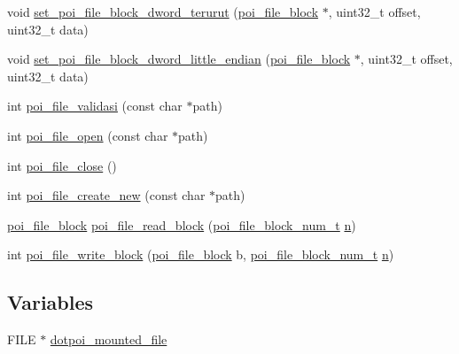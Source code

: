 \begin{DoxyCompactItemize}
\item 
void \hyperlink{file-manager_8h_a0dc02398a042528d16e54822f1543742}{set\-\_\-poi\-\_\-file\-\_\-block\-\_\-dword\-\_\-terurut} (\hyperlink{structpoi__file__block}{poi\-\_\-file\-\_\-block} $\ast$, uint32\-\_\-t offset, uint32\-\_\-t data)
\item 
void \hyperlink{file-manager_8h_a3e138c2766b909a90fd280bc5e899bfe}{set\-\_\-poi\-\_\-file\-\_\-block\-\_\-dword\-\_\-little\-\_\-endian} (\hyperlink{structpoi__file__block}{poi\-\_\-file\-\_\-block} $\ast$, uint32\-\_\-t offset, uint32\-\_\-t data)
\item 
int \hyperlink{file-manager_8h_af091ab9b6704b6affa17ea12fd51e628}{poi\-\_\-file\-\_\-validasi} (const char $\ast$path)
\item 
int \hyperlink{file-manager_8h_ac286b940c82432a07288c7a9afdc884a}{poi\-\_\-file\-\_\-open} (const char $\ast$path)
\item 
int \hyperlink{file-manager_8h_a873cfe2d99ac7a57ff0a391d87c825dd}{poi\-\_\-file\-\_\-close} ()
\item 
int \hyperlink{file-manager_8h_a9a8111f4e7948ad43fef393e0e4e3247}{poi\-\_\-file\-\_\-create\-\_\-new} (const char $\ast$path)
\item 
\hyperlink{structpoi__file__block}{poi\-\_\-file\-\_\-block} \hyperlink{file-manager_8h_ac995e99a526073da84cd4fb1dab93a0a}{poi\-\_\-file\-\_\-read\-\_\-block} (\hyperlink{file-manager_8h_aef709af8fc6566dcaf55b656bb9f8881}{poi\-\_\-file\-\_\-block\-\_\-num\-\_\-t} \hyperlink{allocation-table-test_8c_a24010dade8ebab3f87a48022772cd975}{n})
\item 
int \hyperlink{file-manager_8h_aafd8b089a2a7b6c25cec6ec8c9504e5a}{poi\-\_\-file\-\_\-write\-\_\-block} (\hyperlink{structpoi__file__block}{poi\-\_\-file\-\_\-block} b, \hyperlink{file-manager_8h_aef709af8fc6566dcaf55b656bb9f8881}{poi\-\_\-file\-\_\-block\-\_\-num\-\_\-t} \hyperlink{allocation-table-test_8c_a24010dade8ebab3f87a48022772cd975}{n})
\end{DoxyCompactItemize}
\subsection*{Variables}
\begin{DoxyCompactItemize}
\item 
F\-I\-L\-E $\ast$ \hyperlink{file-manager_8h_a45917dedb770baeed00c159332c7e736}{dotpoi\-\_\-mounted\-\_\-file}
\end{DoxyCompactItemize}


